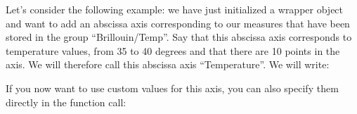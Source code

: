 \documentclass[letterpaper,10pt,english]{sphinxmanual}
\begin{document}
\sphinxAtStartPar
{}
Let’s consider the following example: we have just initialized a wrapper object and want to add an abscissa axis corresponding to our measures that have been stored in the group “Brillouin/Temp”. Say that this abscissa axis corresponds to temperature values, from 35 to 40 degrees and that there are 10 points in the axis. We will therefore call this abscissa axis “Temperature”. We will write:

\begin{sphinxVerbatim}[commandchars=\\\{\}]
    
                  
                  
                  
                  
                  
\end{sphinxVerbatim}

\sphinxAtStartPar
If you now want to use custom values for this axis, you can also specify them directly in the function call:

\begin{sphinxVerbatim}[commandchars=\\\{\}]
  
                  
                  
                  
                  
                  
\end{sphinxVerbatim}
\end{document}
